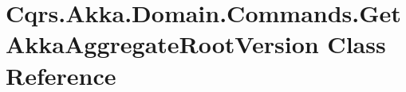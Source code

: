 \hypertarget{classCqrs_1_1Akka_1_1Domain_1_1Commands_1_1GetAkkaAggregateRootVersion}{}\section{Cqrs.\+Akka.\+Domain.\+Commands.\+Get\+Akka\+Aggregate\+Root\+Version Class Reference}
\label{classCqrs_1_1Akka_1_1Domain_1_1Commands_1_1GetAkkaAggregateRootVersion}
